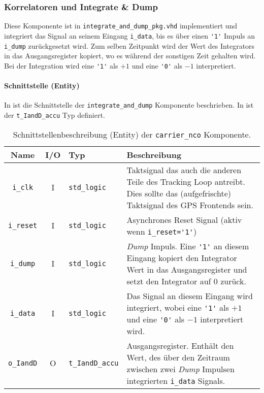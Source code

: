 \subsubsection{Korrelatoren und Integrate \& Dump}


Diese Komponente ist in \lstinline$integrate_and_dump_pkg.vhd$ implementiert und integriert das Signal an seinem Eingang \lstinline$i_data$, bis es über einen \lstinline$'1'$ Impuls an \lstinline$i_dump$ zurückgesetzt wird. Zum selben Zeitpunkt wird der Wert des Integrators in das Ausgangsregister kopiert, wo es während der sonstigen Zeit gehalten wird. Bei der Integration wird eine \lstinline$'1'$ als $+1$ und eine \lstinline$'0'$ als $-1$ interpretiert.

\paragraph{Schnittstelle (Entity)}
In  ist die Schnittstelle der \lstinline$integrate_and_dump$ Komponente beschrieben. In  ist der \lstinline$t_IandD_accu$ Typ definiert.

\begin{table}[htbp]
    \ttabbox
    {
        \caption[Carrier NCO Schnittstelle]{Schnittstellenbeschreibung (Entity) der \lstinline$carrier_nco$ Komponente.}
        \label{TabIandD_Entity}
    }
    {
    \begin{tabular}{c c  p{2cm} p{6cm}}
        \toprule
        Name                    & I/O	& Typ				& Beschreibung \\
        \midrule
        \lstinline$i_clk$	& I	& \lstinline$std_logic$		& Taktsignal das auch die anderen Teile des Tracking Loop antreibt. Dies sollte das (aufgefrischte) Taktsignal des GPS Frontends sein.\\
        \lstinline$i_reset$	& I	& \lstinline$std_logic$		& Asynchrones Reset Signal (aktiv wenn \lstinline$i_reset='1'$) \\
        \lstinline$i_dump$	& I	& \lstinline$std_logic$		& \emph{Dump} Impuls. Eine \lstinline$'1'$ an diesem Eingang kopiert den Integrator Wert in das Ausgangsregister und setzt den Integrator auf $0$ zurück.\\
        \lstinline$i_data$	& I	& \lstinline$std_logic$		& Das Signal an diesem Eingang wird integriert, wobei eine \lstinline$'1'$ als $+1$ und eine \lstinline$'0'$ als $-1$ interpretiert wird.\\
        \lstinline$o_IandD$	& O	& \lstinline$t_IandD_accu$	& Ausgangsregister. Enthält den Wert, des über den Zeitraum zwischen zwei \emph{Dump} Impulsen integrierten \lstinline$i_data$ Signals.\\
        \bottomrule
    \end{tabular}
}
\end{table}


